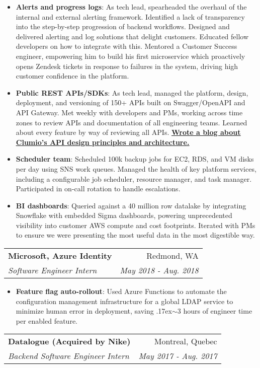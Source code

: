 \documentclass[letterpaper,11pt]{article}
\makeatletter
\newcommand{\resumeItem}[2]{
  \item\small{
    \textbf{#1}{: #2 \vspace{-2pt}}
  }
}
\newcommand{\resumeSubheading}[4]{
  \vspace{-1pt}
    \begin{tabular*}{0.97\textwidth}{l@{\extracolsep{\fill}}r}
      \textbf{#1} & #2 \\
      \textit{\small#3} & \textit{\small #4} \\
    \end{tabular*}\vspace{-5pt}
}
\newcommand{\resumeItemListStart}{\begin{itemize}}
\newcommand{\resumeItemListEnd}{\end{itemize}\vspace{-5pt}}
\makeatother
\begin{document}
      \resumeItemListStart
        \resumeItem{Alerts and progress logs}
          {As tech lead, spearheaded the overhaul of the internal and external alerting framework. Identified a lack of transparency into the step-by-step progression of backend workflows. Designed and delivered alerting and log solutions that delight customers. Educated fellow developers on how to integrate with this. Mentored a Customer Success engineer, empowering him to build his first microservice which proactively opens Zendesk tickets in response to failures in the system, driving high customer confidence in the platform.}
        \resumeItem{Public REST APIs/SDKs}
          {As tech lead, managed the platform, design, deployment, and versioning of 150+ APIs built on Swagger/OpenAPI and API Gateway. Met weekly with developers and PMs, working across time zones to review APIs and documentation of all engineering teams. Learned about every feature by way of reviewing all APIs. \newline \href{https://clumio.com/an-outstanding-user-experience-for-api-developers-think-ux-for-rest-apis/}{\underline{\textbf{Wrote a blog about Clumio's API design principles and architecture.}}}}
      \resumeItem{Scheduler team}
          {Scheduled 100k backup jobs for EC2, RDS, and VM disks per day using SNS work queues. Managed the health of key platform services, including a configurable job scheduler, resource manager, and task manager. Participated in on-call rotation to handle escalations.}
      \resumeItem{BI dashboards}
          {Queried against a 40 million row datalake by integrating Snowflake with embedded Sigma dashboards, powering unprecedented visibility into customer AWS compute and cost footprints. Iterated with PMs to ensure  we were presenting the most useful data in the most digestible way.}
      \resumeItemListEnd
    \vspace{5mm}
    \resumeSubheading
      {Microsoft, Azure Identity}{Redmond, WA}
      {Software Engineer Intern}{May 2018 - Aug. 2018}
          \vspace{2mm}
      \resumeItemListStart
        \resumeItem{Feature flag auto-rollout}
          {Used Azure Functions to automate the configuration management infrastructure for a global LDAP service to minimize human error in deployment, saving {\raise.17ex\hbox{$\scriptstyle\sim$}}3 hours of engineer time per enabled feature.}
      \resumeItemListEnd
    \vspace{5mm}
    \resumeSubheading
      {Datalogue (Acquired by Nike)}{Montreal, Quebec}
      {Backend Software Engineer Intern}{May 2017 - Aug. 2017}
      
\end{document}
